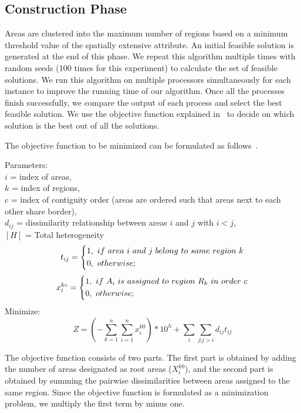 \documentclass[conference]{IEEEtran}
\begin{document}
\subsection{Construction Phase}
Areas are clustered into the maximum number of regions based on
a minimum threshold value of the spatially extensive attribute. An initial feasible
solution is generated at the end of this phase. We repeat this algorithm
multiple times with random seeds (100 times for this experiment) to calculate the set of feasible
solutions. We run this algorithm on multiple processors simultaneously for each
instance to improve the running time of our algorithm. Once all the processes
finish successfully, we compare the output of each process and select the best
feasible solution. We use the objective function explained in~\cite{r1} to
decide on which solution is the best out of all the solutions.

The objective function to be minimized  can be formulated as follows~\cite{r1}.

Parameters:\\
$i$ = index of areas,\\
$k$ = index of regions,\\
$c$ = index of contiguity order (areas are ordered such that areas next to each other share border),\\
$d_{ij}$ = dissimilarity relationship between areas $i$ and $j$ with $i < j$,\\
$[H]$ = Total heterogeneity\\
\begin{equation*}[H]
t_{ij} = \begin{dcases*}
        1,\ if\ area\ i\ and\ j\ belong\ to\ same\ region\ k\\
        0,\ otherwise;
        \end{dcases*}
\end{equation*}
\begin{equation*}[H]
x_i^{kc} = \begin{dcases*}
        1,\ if\ A_i\ is\ assigned\ to\ region\ R_k\ in\ order\ c\\
        0,\ otherwise;
        \end{dcases*}
\end{equation*}
Minimize:
\begin{equation*}[H]
Z = (-\sum_{k=1}^n \sum_{i=1}^n x_i^{k0}) *10^h + \sum_{i} \sum_{j|j>i} d_{ij} t_{ij}
\end{equation*}

The objective function consists of two parts. The first
part is obtained by adding the number of areas designated as root areas
($X_i^{k0}$), and the second part is obtained by summing the pairwise
dissimilarities between areas assigned to the same region. Since the objective
function is formulated as a minimization problem, we multiply the first term by
minus one.
\end{document}
